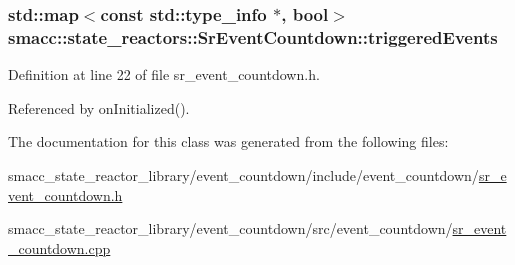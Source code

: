 \subsubsection[{\texorpdfstring{triggered\+Events}{triggeredEvents}}]{\setlength{\rightskip}{0pt plus 5cm}std\+::map$<$const std\+::type\+\_\+info $\ast$, {\bf bool}$>$ smacc\+::state\+\_\+reactors\+::\+Sr\+Event\+Countdown\+::triggered\+Events\hspace{0.3cm}{\ttfamily [private]}}\hypertarget{classsmacc_1_1state__reactors_1_1SrEventCountdown_a6f9b3a51e8e8becbf76f99a5d0bcb8c5}{}\label{classsmacc_1_1state__reactors_1_1SrEventCountdown_a6f9b3a51e8e8becbf76f99a5d0bcb8c5}


Definition at line 22 of file sr\+\_\+event\+\_\+countdown.\+h.



Referenced by on\+Initialized().



The documentation for this class was generated from the following files\+:\begin{DoxyCompactItemize}
\item 
smacc\+\_\+state\+\_\+reactor\+\_\+library/event\+\_\+countdown/include/event\+\_\+countdown/\hyperlink{sr__event__countdown_8h}{sr\+\_\+event\+\_\+countdown.\+h}\item 
smacc\+\_\+state\+\_\+reactor\+\_\+library/event\+\_\+countdown/src/event\+\_\+countdown/\hyperlink{sr__event__countdown_8cpp}{sr\+\_\+event\+\_\+countdown.\+cpp}\end{DoxyCompactItemize}
